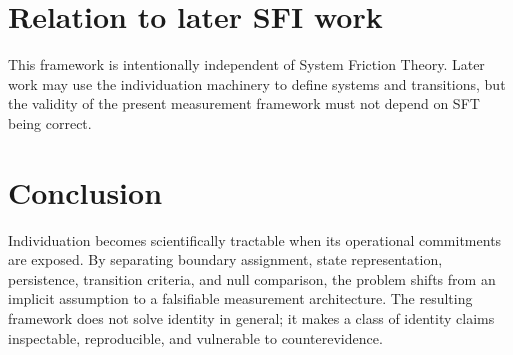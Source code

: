 \documentclass[11pt]{article}
\begin{document}
\section{Relation to later SFI work}
This framework is intentionally independent of System Friction Theory. Later work may use the individuation machinery to define systems and transitions, but the validity of the present measurement framework must not depend on SFT being correct.

\section{Conclusion}
Individuation becomes scientifically tractable when its operational commitments are exposed. By separating boundary assignment, state representation, persistence, transition criteria, and null comparison, the problem shifts from an implicit assumption to a falsifiable measurement architecture. The resulting framework does not solve identity in general; it makes a class of identity claims inspectable, reproducible, and vulnerable to counterevidence.
\end{document}
